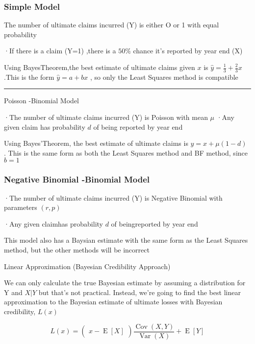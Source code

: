 \documentclass[
]{article}
\begin{document}
\subsubsection{Simple Model}\label{simple-model}

The number of ultimate claims incurred (Y) is either O or 1 with equal
probability

·If there is a claim (Y=1) ,there is a \(50\%\) chance it's reported by
year end (X)

Using BayesTheorem,the best estimate of ultimate claims given \(x\) is
\(\hat{y}=\frac{1}{3}+\frac{2}{3}x\) .This is the form \(\hat{y}=a+bx\)
, so only the Least Squares method is compatible

\begin{center}\rule{0.5\linewidth}{0.5pt}\end{center}

Poisson -Binomial Model

·The number of ultimate claims incurred (Y) is Poisson with mean \(\mu\)
·Any given claim has probability \(d\) of being reported by year end

Using Bayes'Theorem, the best estimate of ultimate claims is
\(\hat{y} = x+ \mu ( 1- d)\) . This is the same form as both the Least
Squares method and BF method, since \(b=1\)

\subsubsection{Negative Binomial -Binomial
Model}\label{negative-binomial--binomial-model}

·The number of ultimate claims incurred (Y) is Negative Binomial with
parameters \((r,p)\)

·Any given claimhas probability \(d\) of beingreported by year end

This model also has a Baysian estimate with the same form as the Least
Squares method, but the other methods will be incorrect

Linear Approximation (Bayesian Credibility Approach)

We can only calculate the true Bayesian estimate by assuming a
distribution for Y and \(X|Y\) but that's not practical. Instead, we're
going to find the best linear approximation to the Bayesian estimate of
ultimate losses with Bayesian credibility, \(L(x)\)

\[L(x)=\begin{pmatrix}x-\operatorname{E}[X]\end{pmatrix}\frac{\operatorname{Cov}(X,Y)}{\operatorname{Var}(X)}+\operatorname{E}[Y]\]
\end{document}
